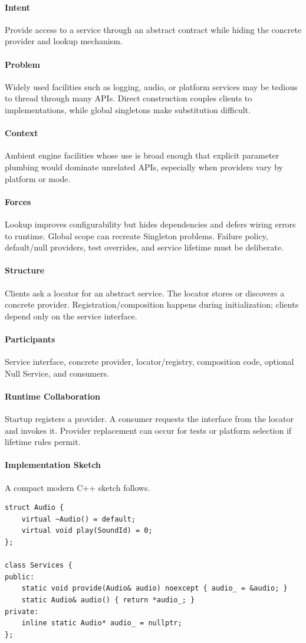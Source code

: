 \documentclass[11pt]{article}
\begin{document}
\paragraph{Intent} Provide access to a service through an abstract contract while hiding the concrete provider and lookup mechanism.
\paragraph{Problem} Widely used facilities such as logging, audio, or platform services may be tedious to thread through many APIs. Direct construction couples clients to implementations, while global singletons make substitution difficult.
\paragraph{Context} Ambient engine facilities whose use is broad enough that explicit parameter plumbing would dominate unrelated APIs, especially when providers vary by platform or mode.
\paragraph{Forces} Lookup improves configurability but hides dependencies and defers wiring errors to runtime. Global scope can recreate Singleton problems. Failure policy, default/null providers, test overrides, and service lifetime must be deliberate.
\paragraph{Structure} Clients ask a locator for an abstract service. The locator stores or discovers a concrete provider. Registration/composition happens during initialization; clients depend only on the service interface.
\paragraph{Participants} Service interface, concrete provider, locator/registry, composition code, optional Null Service, and consumers.
\paragraph{Runtime Collaboration} Startup registers a provider. A consumer requests the interface from the locator and invokes it. Provider replacement can occur for tests or platform selection if lifetime rules permit.
\paragraph{Implementation Sketch} A compact modern C++ sketch follows.
\begin{lstlisting}
struct Audio {
    virtual ~Audio() = default;
    virtual void play(SoundId) = 0;
};

class Services {
public:
    static void provide(Audio& audio) noexcept { audio_ = &audio; }
    static Audio& audio() { return *audio_; }
private:
    inline static Audio* audio_ = nullptr;
};
\end{lstlisting}
\end{document}
